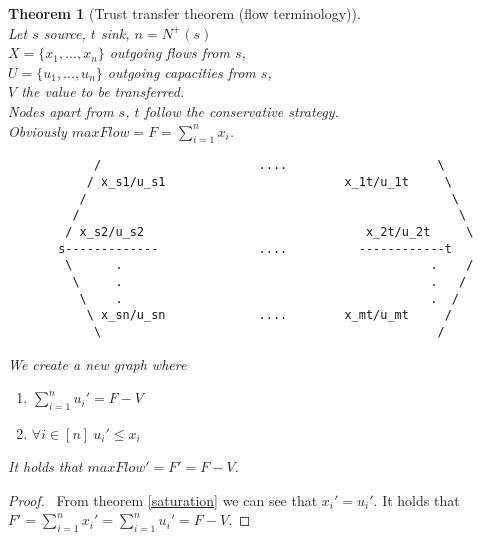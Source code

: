\documentclass[11pt]{article}
\newtheorem{theorem}{Theorem}[section]
\theoremstyle{definition}
\theoremstyle{corollary}
\newtheorem{corollary}{Corollary}[section]
\theoremstyle{lemma}
\begin{document}
    \begin{theorem}[Trust transfer theorem (flow terminology)] \ \\
    \label{trusttransfer}
       Let $s$ source, $t$ sink, $n = N^{+}(s)$ \\
       $X = \{x_1, ..., x_n\}$ outgoing flows from $s$, \\
       $U = \{u_1, ..., u_n\}$ outgoing capacities from $s$, \\
       $V$ the value to be transferred. \\
       Nodes apart from $s$, $t$ follow the conservative strategy. \\
       Obviously $maxFlow = F = \sum\limits_{i=1}^{n}{x_i}$.
       {\em \begin{lstlisting}
            /                      ....                     \
           / x_s1/u_s1                         x_1t/u_1t     \
          /                                                   \
         /                                                     \
        / x_s2/u_s2                               x_2t/u_2t     \
       s-------------              ....          ------------t
        \      .                                           .    /
         \     .                                           .   /
          \    .                                           .  /
           \ x_sn/u_sn             ....        x_mt/u_mt     /
            \                                               /
       \end{lstlisting}}
       We create a new graph where
       \begin{enumerate}
         \item  $\sum\limits_{i=1}^{n}{u_i'} = F - V$
         \item $\forall i \in [n] \: u_i' \leq x_i$
       \end{enumerate}
 
       It holds that $maxFlow' = F' = F - V$.
    \end{theorem}
    \begin{proof} \
        From theorem \ref{saturation} we can see that $x_i' = u_i'$. It holds that $F' = \sum\limits_{i=1}^nx_i' =
        \sum\limits_{i=1}^nu_i' = F - V$.
    \end{proof}

\end{document}
